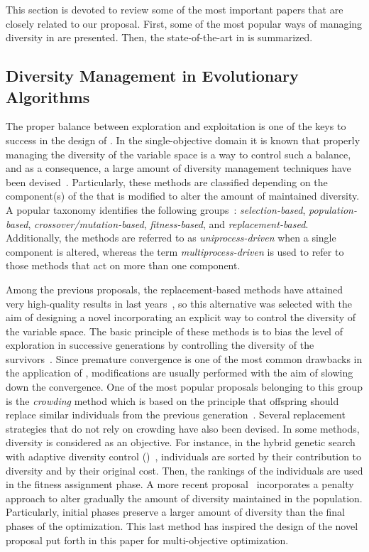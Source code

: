 This section is devoted to review some of the most important papers that are closely related to our proposal.
%
First, some of the most popular ways of managing diversity in \EAS{} are presented.
%
Then, the state-of-the-art in \MOEAS{} is summarized.

\subsection{Diversity Management in Evolutionary Algorithms}

The proper balance between exploration and exploitation is one of the keys to success in the design of \EAS{}.
%
In the single-objective domain it is known that properly managing the diversity of the variable space is a way to control such a balance,
and as a consequence, a large amount of diversity management techniques have been devised~\cite{Mohan:14}.
%
Particularly, these methods are classified depending on the component(s) of the \EA{} that is modified to alter the 
amount of maintained diversity.
%
A popular taxonomy identifies the following groups~\cite{Joel:Crepinsek}: \textit{selection-based}, \textit{population-based}, 
\textit{crossover/mutation-based}, \textit{fitness-based}, and \textit{replacement-based}.
%
Additionally, the methods are referred to as \textit{uniprocess-driven} when a single component is altered, whereas the term
\textit{multiprocess-driven} is used to refer to those methods that act on more than one component.

Among the previous proposals, the replacement-based methods have attained very high-quality results in last years~\cite{Segura:17}, so
this alternative was selected with the aim of designing a novel \MOEA{} incorporating an explicit way to control the diversity 
of the variable space.
%
The basic principle of these methods is to bias the level of exploration in successive generations by 
controlling the diversity of the survivors~\cite{Segura:17}.
%
Since premature convergence is one of the most common drawbacks in the application of \EAS{}, 
modifications are usually performed with the aim of slowing down the convergence.
%
One of the most popular proposals belonging to this group is the \textit{crowding} method which
is based on the principle that offspring should replace similar individuals from the previous generation~\cite{Mengshoel:14}.
%
Several replacement strategies that do not rely on crowding have also been devised.
%
In some methods, diversity is considered as an objective.
%
For instance, in the hybrid genetic search with adaptive diversity control (\HGSADC{})~\cite{Vidal:13}, individuals are sorted 
by their contribution to diversity and by their original cost.
%
Then, the rankings of the individuals are used in the fitness assignment phase.
%
A more recent proposal~\cite{Segura:17} incorporates a penalty approach to alter gradually the amount of diversity 
maintained in the population.
%
Particularly, initial phases preserve a larger amount of diversity than the final phases of the optimization.
%
This last method has inspired the design of the novel proposal put forth in this paper for multi-objective optimization.
%

